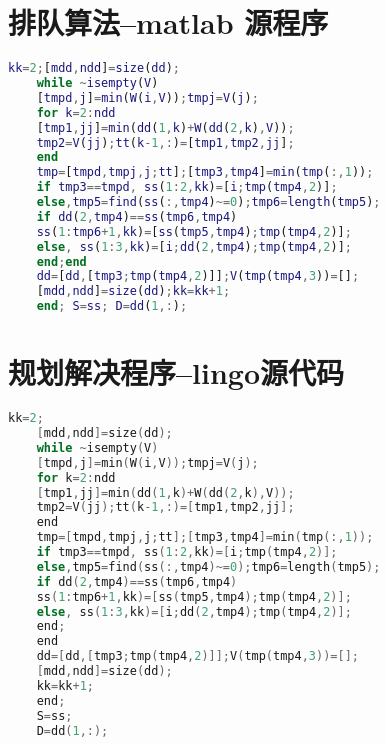 \documentclass{cumcmthesis}
\begin{document}
\newpage
\begin{appendices}
	\section{排队算法--matlab 源程序}
	\begin{lstlisting}[language=matlab]
	kk=2;[mdd,ndd]=size(dd);
	while ~isempty(V)
	[tmpd,j]=min(W(i,V));tmpj=V(j);
	for k=2:ndd
	[tmp1,jj]=min(dd(1,k)+W(dd(2,k),V));
	tmp2=V(jj);tt(k-1,:)=[tmp1,tmp2,jj];
	end
	tmp=[tmpd,tmpj,j;tt];[tmp3,tmp4]=min(tmp(:,1));
	if tmp3==tmpd, ss(1:2,kk)=[i;tmp(tmp4,2)];
	else,tmp5=find(ss(:,tmp4)~=0);tmp6=length(tmp5);
	if dd(2,tmp4)==ss(tmp6,tmp4)
	ss(1:tmp6+1,kk)=[ss(tmp5,tmp4);tmp(tmp4,2)];
	else, ss(1:3,kk)=[i;dd(2,tmp4);tmp(tmp4,2)];
	end;end
	dd=[dd,[tmp3;tmp(tmp4,2)]];V(tmp(tmp4,3))=[];
	[mdd,ndd]=size(dd);kk=kk+1;
	end; S=ss; D=dd(1,:);
	\end{lstlisting}
	\section{规划解决程序--lingo源代码}
	\begin{lstlisting}[language=c]
	kk=2;
	[mdd,ndd]=size(dd);
	while ~isempty(V)
	[tmpd,j]=min(W(i,V));tmpj=V(j);
	for k=2:ndd
	[tmp1,jj]=min(dd(1,k)+W(dd(2,k),V));
	tmp2=V(jj);tt(k-1,:)=[tmp1,tmp2,jj];
	end
	tmp=[tmpd,tmpj,j;tt];[tmp3,tmp4]=min(tmp(:,1));
	if tmp3==tmpd, ss(1:2,kk)=[i;tmp(tmp4,2)];
	else,tmp5=find(ss(:,tmp4)~=0);tmp6=length(tmp5);
	if dd(2,tmp4)==ss(tmp6,tmp4)
	ss(1:tmp6+1,kk)=[ss(tmp5,tmp4);tmp(tmp4,2)];
	else, ss(1:3,kk)=[i;dd(2,tmp4);tmp(tmp4,2)];
	end;
	end
	dd=[dd,[tmp3;tmp(tmp4,2)]];V(tmp(tmp4,3))=[];
	[mdd,ndd]=size(dd);
	kk=kk+1;
	end;
	S=ss;
	D=dd(1,:);
	\end{lstlisting}
\end{appendices}
\end{document}
